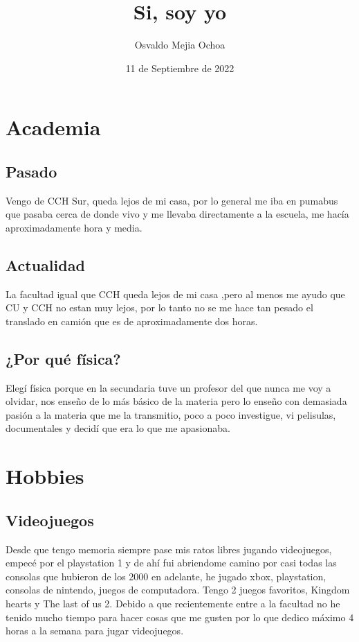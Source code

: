 \documentclass[letterpaper,pt12]{article}
\title{Si, soy yo}
\author{Osvaldo Mejia Ochoa }
\date{11 de Septiembre de 2022}
\begin{document}
\maketitle


\section{Academia}


 \subsection{Pasado}
 Vengo de CCH Sur, queda lejos de mi casa, por lo general me iba en pumabus que pasaba cerca de donde vivo y me llevaba directamente a la escuela, me hacía aproximadamente hora y media.

 \subsection{Actualidad}
 La facultad igual que CCH queda lejos de mi casa ,pero al menos me ayudo que CU y CCH no estan muy lejos, por lo tanto no se me hace tan pesado el translado en camión que es de aproximadamente dos horas.

 \subsection{¿Por qué física?}
 Elegí física porque en la secundaria tuve un profesor del que nunca me voy a olvidar, nos enseño de lo más básico de la materia pero lo enseño con demasiada pasión a la materia que me la transmitio, poco a poco investigue, vi pelisulas, documentales y decidí que era lo que me apasionaba.
 
 

\section{Hobbies}

 \subsection{Videojuegos}
 Desde que tengo memoria siempre pase mis ratos libres jugando videojuegos, empecé por el playstation 1 y de ahí fui abriendome camino por casi todas las consolas que hubieron de los 2000 en adelante, he jugado xbox, playstation, consolas de nintendo, juegos de computadora.
 Tengo 2 juegos favoritos, Kingdom hearts y The last of us 2. Debido a que recientemente entre a la facultad no he tenido mucho tiempo para hacer cosas que me gusten por lo que  dedico máximo 4 horas a la semana para jugar videojuegos.
\end{document}
